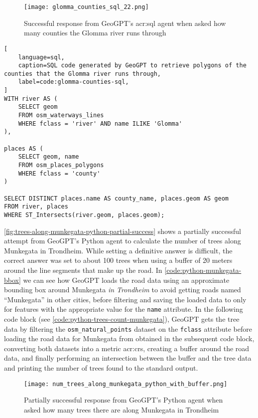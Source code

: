 \begin{figure}[htbp]
    \centering
    \texttt{[image: glomma\_counties\_sql\_22.png]}
    \caption{Successful response from GeoGPT's \acrshort{acr:sql} agent when asked how many counties the Glomma river runs through}
    \label{fig:glomma-counties-sql-successful}
\end{figure}

\FloatBarrier

\begin{lstlisting}[
    language=sql,
    caption=SQL code generated by GeoGPT to retrieve polygons of the counties that the Glomma river runs through,
    label=code:glomma-counties-sql,
]
WITH river AS (
    SELECT geom 
    FROM osm_waterways_lines 
    WHERE fclass = 'river' AND name ILIKE 'Glomma'
),

places AS (
    SELECT geom, name 
    FROM osm_places_polygons 
    WHERE fclass = 'county'
)

SELECT DISTINCT places.name AS county_name, places.geom AS geom
FROM river, places
WHERE ST_Intersects(river.geom, places.geom);    
\end{lstlisting}

\FloatBarrier

\autoref{fig:trees-along-munkegata-python-partial-success} shows a partially successful attempt from GeoGPT's Python agent to calculate the number of trees along Munkegata in Trondheim. While setting a definitive answer is difficult, the correct answer was set to about 100 trees when using a buffer of 20 meters around the line segments that make up the road. In \autoref{code:python-munkegata-bbox} we can see how GeoGPT loads the road data using an approximate bounding box around Munkegata \textit{in Trondheim} to avoid getting roads named \enquote{Munkegata} in other cities, before filtering and saving the loaded data to only for features with the appropriate value for the \texttt{name} attribute. In the following code block (see \autoref{code:python-trees-count-munkegata}), GeoGPT gets the tree data by filtering the \texttt{osm\_natural\_points} dataset on the \texttt{fclass} attribute before loading the road data for Munkegata from obtained in the subsequent code block, converting both datasets into a metric \acrshort{acr:crs}, creating a buffer around the road data, and finally performing an intersection between the buffer and the tree data and printing the number of trees found to the standard output.

\begin{figure}[htbp]
    \centering
    \texttt{[image: num\_trees\_along\_munkegata\_python\_with\_buffer.png]}
    \caption{Partially successful response from GeoGPT's Python agent when asked how many trees there are along Munkegata in Trondheim}
    \label{fig:trees-along-munkegata-python-partial-success}
\end{figure}

